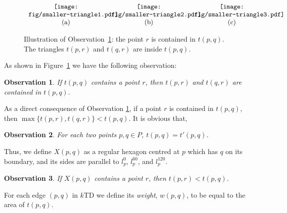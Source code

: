 \documentclass[11pt,a4paper]{article}
\newcommand{\kTD}[2]{$#1$\text{-}TD#2}
\newtheorem{observation}{Observation}
\begin{document}
\begin{figure}[htb]
  \centering
\setlength{\tabcolsep}{0in}
  $\begin{tabular}{ccc}
\multicolumn{1}{m{.33\columnwidth}}{\centering\texttt{[image: fig/smaller-triangle1.pdf]}}
&\multicolumn{1}{m{.33\columnwidth}}{\centering\texttt{[image: fig/smaller-triangle2.pdf]}} &\multicolumn{1}{m{.33\columnwidth}}{\centering\texttt{[image: fig/smaller-triangle3.pdf]}}
\\
(a) & (b)& (c)
\end{tabular}$
  \caption{Illustration of Observation~\ref{obs1}: the point $r$ is contained in $t(p,q)$. The triangles $t(p,r)$ and $t(q,r)$ are inside $t(p,q)$.}
\label{smaller-triangle-fig}
\end{figure}

As shown in Figure~\ref{smaller-triangle-fig} we have the following observation:

\begin{observation}
\label{obs1}
 If $t(p,q)$ contains a point $r$, then $t(p,r)$ and $t(q,r)$ are contained in $t(p,q)$.
\end{observation}
As a direct consequence of Observation \ref{obs1}, if a point $r$ is contained in $t(p,q)$, then $\max\{t(p,r), \allowbreak t(q,r)\}<t(p,q)$. It is obvious that,

\begin{observation}
 \label{equal-triangles}
 For each two points $p,q\in P$, $t(p,q)=t'(p,q)$.
\end{observation}
Thus, we define $X(p,q)$ as a regular hexagon centred at $p$ which has $q$ on its boundary, and its sides are parallel to $l_p^0$, $l_p^{60}$, and $l_p^{120}$. 
\begin{observation}
\label{obs2}
 If $X(p,q)$ contains a point $r$, then $t(p,r)<t(p,q)$.
\end{observation}
For each edge $(p,q)$ in \kTD{k}{} we define its {\em weight}, $w(p,q)$, to be equal to the area of $t(p,q)$.
\end{document}
